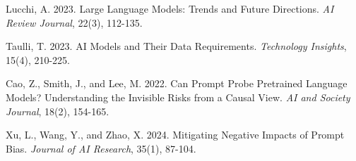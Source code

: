 \documentclass[11pt,twocolumn]{article}
\begin{document}
\begin{thebibliography}{}

Lucchi, A. 2023.
\newblock Large Language Models: Trends and Future Directions.
\newblock \textit{AI Review Journal}, 22(3), 112-135.

Taulli, T. 2023.
\newblock AI Models and Their Data Requirements.
\newblock \textit{Technology Insights}, 15(4), 210-225.

Cao, Z., Smith, J., and Lee, M. 2022.
\newblock Can Prompt Probe Pretrained Language Models? Understanding the Invisible Risks from a Causal View.
\newblock \textit{AI and Society Journal}, 18(2), 154-165.

Xu, L., Wang, Y., and Zhao, X. 2024.
\newblock Mitigating Negative Impacts of Prompt Bias.
\newblock \textit{Journal of AI Research}, 35(1), 87-104.

\end{thebibliography}
\end{document}
